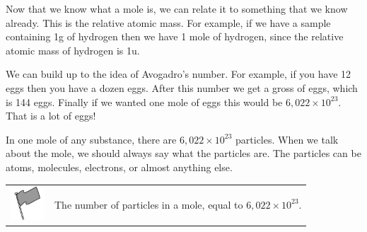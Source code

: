       
\label{m38717*eip-392}Now that we know what a mole is, we can relate it to something that we know already. This is the relative atomic mass. For example, if we have a sample containing 1g of hydrogen then we have 1 mole of hydrogen, since the relative atomic mass of hydrogen is 1u.\par \label{m38717*eip-503}We can build up to the idea of Avogadro's number. For example, if you have 12 eggs then you have a dozen eggs. After this number we get a gross of eggs, which is 144 eggs. Finally if we wanted one mole of eggs this would be \begin{math}6,022\ensuremath{\times}{10}^{23}\end{math}. That is a lot of eggs!\par \label{m38717*eip-460}In one mole of any substance, there are \begin{math}6,022\ensuremath{\times}{10}^{23}\end{math} particles. When we talk about the mole, we should always say what the particles are. The particles can be atoms, molecules, electrons, or almost anything else.\par \label{m38717*fhsst!!!underscore!!!id123}\begin{definition}
	  \begin{tabular*}{15 cm}{m{15 mm}m{}}
	\hspace*{-50pt}  \includegraphics[width=0.5in]{col11305.imgs/psflag2.png}   & \Definition{   \label{id2496617}\textbf{ Avogadro's number }} { \label{m38717*meaningfhsst!!!underscore!!!id123}
      \label{m38717*id276010}The number of particles in a mole, equal to \begin{math}6,022\ensuremath{\times}{10}^{23}\end{math}. \par 
       } 
      \end{tabular*}
      \end{definition}

